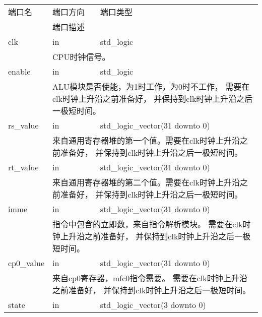         \begin{tabularx}{\textwidth}{lll}
            \toprule
            端口名          & 端口方向 & 端口类型 \\
            \cmidrule(l){2-3}
                            & \multicolumn{2}{l}{端口描述} \\
            \midrule
            clk             & in       & std\_logic \\
            \cmidrule(l){2-3}
            &
            \multicolumn{2}{X}{CPU时钟信号。} \\
            \midrule
            enable          & in       & std\_logic \\
            \cmidrule(l){2-3}
            & 
            \multicolumn{2}{X}{
            ALU模块是否使能，为1时工作，为0时不工作，%
            需要在clk时钟上升沿之前准备好，%
            并保持到clk时钟上升沿之后一极短时间。} \\
            \midrule
            rs\_value        & in       & std\_logic\_vector(31 downto 0) \\
            \cmidrule(l){2-3}
            &
            \multicolumn{2}{X}{
            来自通用寄存器堆的第一个值。需要在clk时钟上升沿之前准备好，%
            并保持到clk时钟上升沿之后一极短时间。} \\
            \midrule
            rt\_value        & in       & std\_logic\_vector(31 downto 0) \\
            \cmidrule(l){2-3}
            & 
            \multicolumn{2}{X}{
            来自通用寄存器堆的第二个值。需要在clk时钟上升沿之前准备好，%
            并保持到clk时钟上升沿之后一极短时间。} \\
            \midrule
            imme            & in       & std\_logic\_vector(31 downto 0) \\
            \cmidrule(l){2-3}
            &
            \multicolumn{2}{X}{
            指令中包含的立即数，来自指令解析模块。%
            需要在clk时钟上升沿之前准备好，%
            并保持到clk时钟上升沿之后一极短时间。} \\
            \midrule
            cp0\_value      & in       & std\_logic\_vector(31 downto 0) \\
            \cmidrule(l){2-3}
            &
            \multicolumn{2}{X}{
            来自cp0寄存器，mfc0指令需要。%
            需要在clk时钟上升沿之前准备好，%
            并保持到clk时钟上升沿之后一极短时间。} \\
            \midrule
            state           & in       & std\_logic\_vector(3 downto 0) \\

\end{tabularx}
